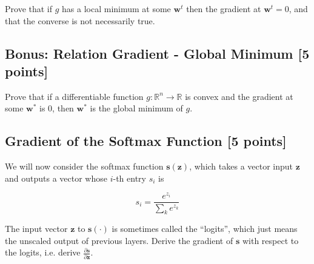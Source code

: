 Prove that if $g$ has a local minimum at some $\mathbf{w}^{t}$ then the gradient at $\mathbf{w}^{t} = 0$, and that the converse
is not necessarily true.


\taskbreak

\subsection{Bonus: Relation Gradient - Global Minimum [5 points]}
Prove that if a differentiable function $g : \mathbb{R}^{n} \rightarrow \mathbb{R}$ is convex and the gradient
at some $\mathbf{w}^*$ is 0, then $\mathbf{w}^*$ is the global minimum of $g$.

    
\taskbreak

\subsection{Gradient of the Softmax Function [5 points]}
We will now consider the softmax function $\mathbf{s}(\mathbf{z})$, which takes a vector input $\mathbf{z}$ and outputs a vector whose $i$-th entry $s_i$ is

\begin{equation}
    s_i = \frac{e^{z_{i}}}{\sum_{k} e^{z_{k}}}
\end{equation}

The input vector $\mathbf{z}$ to $\mathbf{s}(\cdot)$ is sometimes called the ``logits'', which just means the unscaled output of previous layers. Derive the gradient of $\mathbf{s}$ with respect to the logits, i.e. derive $\frac{\partial \mathbf{s}}{\partial \mathbf{z}}$. 

